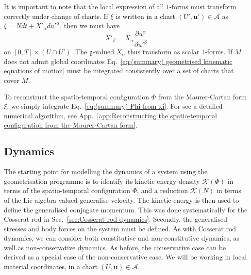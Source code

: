 It is important to note that the local expression of all $1$-forms must transform correctly under change of charts. If $\xi$ is written in a chart $(U', \mathbf{u}') \in \mathcal{A}$ as $\xi = N dt + X'_\alpha du'^\alpha$, then we must have
\begin{equation} \label{eq:X transformation rule}
X'_\beta = X_\alpha \frac{\partial u^\alpha}{\partial u'^\beta}
\end{equation}
on $[0, T] \times (U \cap U')$. The $\mathfrak{g}$-valued $X_\alpha$ thus transform as scalar $1$-forms. If $M$ does not admit global coordinates Eq.~\ref{eq:(summary) geometrised kinematic equations of motion} must be integrated consistently over a set of charts that cover $M$.

To reconstruct the spatio-temporal configuration $\Phi$ from the Maurer-Cartan form $\xi$, we simply integrate Eq.~\ref{eq:(summary) Phi from xi}. For see a detailed numerical algorithm, see App.~\ref{app:Reconstructing the spatio-temporal configuration from the Maurer-Cartan form}.

\subsection{Dynamics} \label{sec:(summary) dynamics}

The starting point for modelling the dynamics of a system using the geometrisation programme is to identify its kinetic energy density $\mathcal{K}(\Phi)$ in terms of the spatio-temporal configuration $\Phi$, and a reduction $\mathcal{K}(N)$ in terms of the Lie algebra-valued generalise velocity. The kinetic energy is then used to define the generalised conjugate momentum. This was done systematically for the Cosserat rod in Sec.~\ref{sec:Cosserat rod dynamics}. Secondly, the generalised stresses and body forces on the system must be defined. As with Cosserat rod dynamics, we can consider both constitutive and non-constitutive dynamics, as well as non-conservative dynamics. As before, the conservative case can be derived as a special case of the non-conservative case. We will be working in local material coordinates, in a chart $(U, \mathbf{u}) \in \mathcal{A}$.

